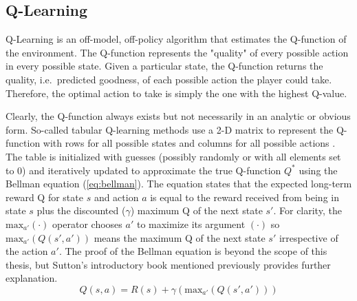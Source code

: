 \subsection{Q-Learning}
Q-Learning is an off-model, off-policy algorithm that estimates the Q-function of the environment. The Q-function represents the "quality" of every possible action in every possible state. Given a particular state, the Q-function returns the quality, i.e.\ predicted goodness, of each possible action the player could take. Therefore, the optimal action to take is simply the one with the highest Q-value. 

Clearly, the Q-function always exists but not necessarily in an analytic or obvious form. So-called tabular Q-learning methods use a 2-D matrix to represent the Q-function with rows for all possible states and columns for all possible actions \cite{mccullock}. The table is initialized with guesses (possibly randomly or with all elements set to 0) and iteratively updated to approximate the true Q-function $Q^*$ using the Bellman equation (\ref{eq:bellman}). The equation states that the expected long-term reward Q for state $s$ and action $a$ is equal to the reward received from being in state $s$ plus the discounted ($\gamma$) maximum Q of the next state $s'$. For clarity, the $\text{max}_{a'}(\cdot)$ operator chooses $a'$ to maximize its argument $(\cdot)$ so $\text{max}_{a'}(Q(s',a'))$ means the maximum Q of the next state $s'$ irrespective of the action $a'$. The proof of the Bellman equation is beyond the scope of this thesis, but Sutton's introductory book mentioned previously provides further explanation.
\begin{equation}
	\label{eq:bellman}
	Q(s,a)=R(s) + \gamma (\text{max}_{a'}(Q(s',a')))
\end{equation}


